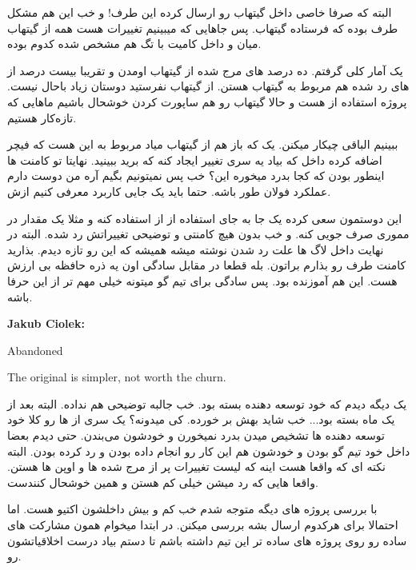 البته که  صرفا  خاصی داخل گیتهاب رو ارسال کرده این طرف! و خب این هم مشکل طرف بوده که فرستاده گیتهاب.
پس جاهایی که میبینیم  تغییرات  هست همه از گیتهاب میان و داخل کامیت با تگ  هم مشخص شده
کدوم  بوده.

یک آمار کلی گرفتم. ده درصد \cl های مرج شده از گیتهاب اومدن و تقریبا بیست درصد از \cl های رد شده هم مربوط به گیتهاب هستن.
از گیتهاب  نفرستید دوستان زیاد باحال نیست.  پروژه استفاده از  هست و حالا گیتهاب رو هم ساپورت کردن خوشحال باشیم
ماهایی که تازه‌کار هستیم.

ببینیم الباقی چیکار میکنن. یک \cl که باز هم از گیتهاب میاد
مربوط به این هست که فیچر اضافه کرده داخل  که بیاد یه سری تغییر ایجاد کنه که برید ببینید. نهایتا تو کامنت ها اینطور بودن که
کجا بدرد میخوره این؟ خب پس نمیتونیم بگیم آره من دوست دارم عملکرد فولان طور باشه. حتما باید یک جایی کاربرد معرفی کنیم ازش.

این دوستمون
سعی کرده یک جا به جای استفاده از  از  استفاده کنه و مثلا یک مقدار در مموری صرف جویی کنه. و خب بدون هیچ کامنتی و توضیحی
تغییراتش رد شده. البته در نهایت داخل لاگ ها علت رد شدن نوشته میشه همیشه که این رو تازه دیدم. بذارید کامنت طرف رو بذارم براتون. بله قطعا
در مقابل سادگی اون یه ذره حافظه بی ارزش هست. این هم آموزنده بود. پس سادگی برای تیم گو میتونه خیلی مهم تر از این حرفا باشه.

\begin{latin}
\textbf{Jakub Ciolek:}

Abandoned

The original is simpler, not worth the churn.
\end{latin}

یک \cl دیگه دیدم که خود توسعه دهنده بسته بود.
خب جالبه توضیحی هم نداده. البته بعد از یک ماه بسته بود... خب شاید بهش بر خورده. کی میدونه؟ یک سری از  ها رو کلا خود توسعه دهنده ها
تشخیص میدن بدرد نمیخورن و خودشون می‌بندن. حتی دیدم بعضا داخل خود تیم گو بودن و خودشون هم این کار رو انجام داده بودن و رد کرده بودن.
البته نکته ای که واقعا هست اینه که لیست تغییرات پر از مرج شده ها و اوپن ها هستن. واقعا \cl هایی که رد میشن خیلی کم هستن و همین خوشحال کنندست.

با بررسی پروژه های دیگه متوجه شدم خب کم و بیش داخلشون اکتیو هست. اما احتمالا برای هرکدوم \cl  ارسال بشه بررسی میکنن. در ابتدا میخوام
همون مشارکت های ساده رو روی پروژه های ساده تر این تیم داشته باشم تا دستم بیاد درست اخلاقیاتشون رو.

